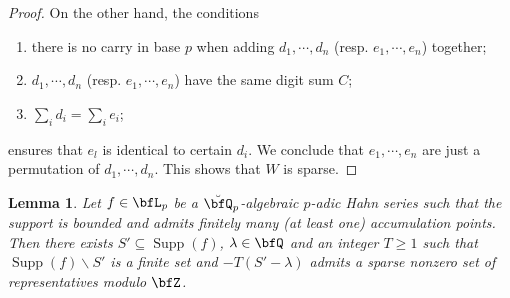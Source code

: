 \documentclass[english,oneside]{smfart}
\newcommand{\opn}[1]{\operatorname{#1}}
\newtheorem{lemma}[theorem]{Lemma}
\begin{document}
\begin{proof}
    On the other hand, the conditions
    \begin{enumerate}
        \item there is no carry in base $p$ when adding $d_1,\cdots,d_n$ (resp. $e_1,\cdots,e_n$) together;
        \item $d_1,\cdots,d_n$ (resp. $e_1,\cdots,e_n$) have the same digit sum $C$;
        \item $\sum_i d_i=\sum_i e_i$;
    \end{enumerate}
    ensures that $e_l$ is identical to certain $d_i$. We conclude that $e_1,\cdots,e_n$ are just a permutation of $d_1,\cdots,d_n$. This shows that $W$ is sparse.
\end{proof}

\begin{lemma}\label{lem:42556}
    Let $f\in\bfL_p$ be a $\breve{\bfQ}_p$-algebraic $p$-adic Hahn series such that the support is bounded and admits finitely many (at least one) accumulation points. Then there exists $S'\subseteq \opn{Supp}(f)$, $\lambda\in\bfQ$ and an integer $T\geq 1$ such that $\opn{Supp}(f)\backslash S'$ is a finite set and $-T(S'-\lambda)$ admits a sparse nonzero set of representatives modulo $\bfZ$.
\end{lemma}
\end{document}
